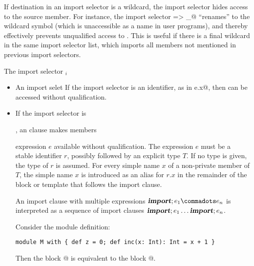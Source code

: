 \documentclass[11pt]{report}
\begin{document}
If destination in an import selector is a wildcard, the import
selector hides access to the source member. For instance, the import
selector \verb@x => _@ ``renames'' \verb@x@ to the wildcard symbol
(which is unaccessible as a name in user programs), and thereby
effectively prevents unqualified access to \verb@x@. This is useful if
there is a final wildcard in the same import selector list, which
imports all members not mentioned in previous import selectors.



The import selector \verb@x$_i$






\begin{itemize}
\item
An import selet
If the import selector is an identifier, as in \verb@import e.x@, then
\verb@x@ can be accessed without qualification.
\item
If the import selector is 


 , an clause makes members

expression $e$ available without qualification. The expression $e$
must be a stable identifier $r$, possibly followed by an explicit type
$T$. If no type is given, the type of $r$ is assumed.  For every
simple name $x$ of a non-private member of $T$, the simple name $x$ is
introduced as an alias for $r.x$ in the remainder of the block or
template that follows the import clause.

An import clause with multiple expressions $\IMPORT;e_1
\commadots e_n$ is interpreted as a sequence of import clauses
$\mbox{\sl\bfseries import};e_1 \ldots \mbox{\sl\bfseries import};e_n$.

\example Consider the module definition:
\begin{verbatim}
module M with { def z = 0; def inc(x: Int): Int = x + 1 }
\end{verbatim}
Then the block
@
is equivalent to the block @.

\end{itemize}
\end{document}
